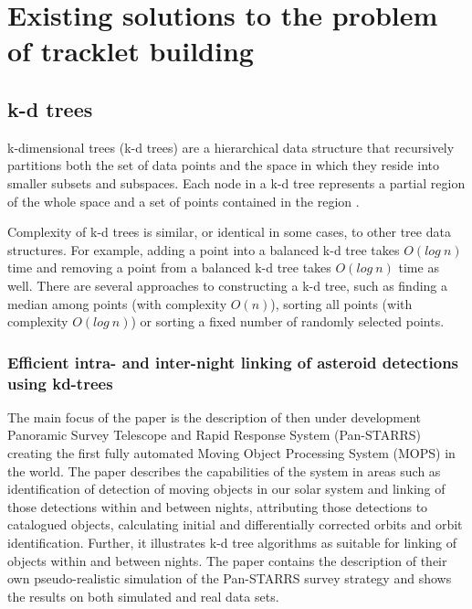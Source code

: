 \chapter{Existing solutions to the problem of tracklet building}\label{chap:existing_solutions}

\section{k-d trees}\label{sec:kd_trees}
	
	k-dimensional trees (k-d trees) are a hierarchical data structure that recursively partitions both the set of data points and the space in which they reside into smaller subsets and subspaces. Each node in a k-d tree represents a partial region of the whole space and a set of points contained in the region \citep{}.
	
	Complexity of k-d trees is similar, or identical in some cases, to other tree data structures. For example, adding a point into a balanced k-d tree takes $O(log\ n)$ time and removing a point from a balanced k-d tree takes $O(log\ n)$ time as well. There are several approaches to constructing a k-d tree, such as finding a median among points (with complexity $O(n)$), sorting all points (with complexity $O(log\ n)$) or sorting a fixed number of randomly selected points.

\subsection{Efficient intra- and inter-night linking of asteroid detections using kd-trees}\label{subsec:intra_inter}

	The main focus of the paper is the description of then under development Panoramic Survey Telescope and Rapid Response System (Pan-STARRS) creating the first fully automated Moving Object Processing System (MOPS) in the world. The paper describes the capabilities of the system in areas such as identification of detection of moving objects in our solar system and linking of those detections within and between nights, attributing those detections to catalogued objects, calculating initial and differentially corrected orbits and orbit identification. Further, it illustrates k-d tree algorithms as suitable for linking of objects within and between nights. The paper contains the description of their own pseudo-realistic simulation of the Pan-STARRS survey strategy and shows the results on both simulated and real data sets.
	
